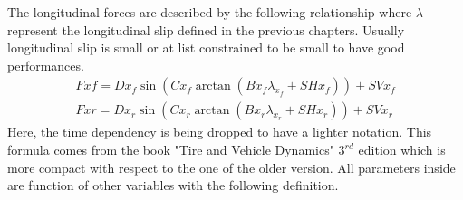 %
%
The longitudinal forces are described by the following relationship where $\lambda$ represent the longitudinal slip defined in the previous chapters. Usually longitudinal slip is small or at list constrained to be small to have good performances.
%
\begin{equation}
    \begin{array}{l}
        Fxf = Dx_f  \sin( Cx_f  \arctan(Bx_f  \lambda_{x_f} + SHx_f  ) ) + SVx_f\\
        Fxr = Dx_r  \sin( Cx_r  \arctan(Bx_r  \lambda_{x_r} + SHx_r  ) ) + SVx_r
    \end{array}
\end{equation}
%
Here, the time dependency is being dropped to have a lighter notation. This formula comes from the book "Tire and Vehicle Dynamics" $3^{rd}$ edition\cite{pacejka2012tire} which is more compact with respect to the one of the older version\cite{pacejka2006tyre}.
All parameters inside are function of other variables with the following definition.
%
